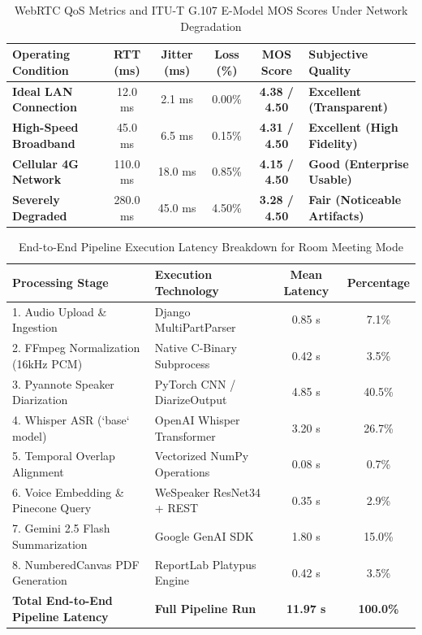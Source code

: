 \documentclass[12pt,oneside,letterpaper]{report}
\numberwithin{equation}{chapter} %
\begin{document}
\begin{table}[H]
\centering
\caption{WebRTC QoS Metrics and ITU-T G.107 E-Model MOS Scores Under Network Degradation}
\label{tab:webrtc_qos}
\footnotesize
\begin{tabularx}{\textwidth}{p{4.5cm}c c c c X}
\toprule
\textbf{Operating Condition} & \textbf{RTT (ms)} & \textbf{Jitter (ms)} & \textbf{Loss (\%)} & \textbf{MOS Score} & \textbf{Subjective Quality} \\
\midrule
\textbf{Ideal LAN Connection} & 12.0 ms & 2.1 ms & 0.00\% & \textbf{4.38 / 4.50} & \textbf{Excellent (Transparent)} \\
\textbf{High-Speed Broadband} & 45.0 ms & 6.5 ms & 0.15\% & \textbf{4.31 / 4.50} & \textbf{Excellent (High Fidelity)} \\
\textbf{Cellular 4G Network} & 110.0 ms & 18.0 ms & 0.85\% & \textbf{4.15 / 4.50} & \textbf{Good (Enterprise Usable)} \\
\textbf{Severely Degraded} & 280.0 ms & 45.0 ms & 4.50\% & \textbf{3.28 / 4.50} & \textbf{Fair (Noticeable Artifacts)} \\
\bottomrule
\end{tabularx}
\end{table}

\begin{table}[H]
\centering
\caption{End-to-End Pipeline Execution Latency Breakdown for Room Meeting Mode}
\label{tab:pipeline_latency}
\footnotesize
\begin{tabularx}{\textwidth}{X p{4.5cm}c c}
\toprule
\textbf{Processing Stage} & \textbf{Execution Technology} & \textbf{Mean Latency} & \textbf{Percentage} \\
\midrule
1. Audio Upload \& Ingestion & Django MultiPartParser & 0.85 s & 7.1\% \\
2. FFmpeg Normalization (16kHz PCM) & Native C-Binary Subprocess & 0.42 s & 3.5\% \\
3. Pyannote Speaker Diarization & PyTorch CNN / DiarizeOutput & 4.85 s & 40.5\% \\
4. Whisper ASR (`base` model) & OpenAI Whisper Transformer & 3.20 s & 26.7\% \\
5. Temporal Overlap Alignment & Vectorized NumPy Operations & 0.08 s & 0.7\% \\
6. Voice Embedding \& Pinecone Query & WeSpeaker ResNet34 + REST & 0.35 s & 2.9\% \\
7. Gemini 2.5 Flash Summarization & Google GenAI SDK & 1.80 s & 15.0\% \\
8. NumberedCanvas PDF Generation & ReportLab Platypus Engine & 0.42 s & 3.5\% \\
\midrule
\textbf{Total End-to-End Pipeline Latency} & \textbf{Full Pipeline Run} & \textbf{11.97 s} & \textbf{100.0\%} \\
\bottomrule
\end{tabularx}
\end{table}
\end{document}
